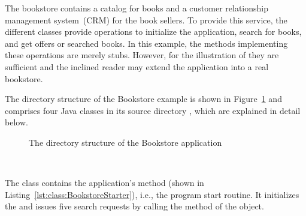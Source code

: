 \pagebreak

The bookstore contains a catalog for books and a customer relationship management system~(CRM) for the book sellers. To provide this service, the different classes provide operations to initialize the application, search for books, and get offers or searched books. In this example, the methods implementing these operations are merely stubs. However, for the illustration of \Kieker{} they are sufficient and the inclined reader may extend the application into a real bookstore.

The directory structure of the Bookstore example is shown in Figure~\ref{fig:PlainBookstoreExample} and comprises four Java classes in its source directory , which are explained in detail below.

\begin{figure}[H]
\begin{graybox}
\end{graybox}

\caption{The directory structure of the Bookstore application}
\label{fig:PlainBookstoreExample}
\end{figure}


\quad\

\enlargethispage{1cm}

\noindent The class  contains the application's  method (shown in Listing~\ref{lst:class:BookstoreStarter}), i.e., the program start routine. It initializes the  and issues five search requests by calling the  method of the  object.

\medskip

\setJavaCodeListing



